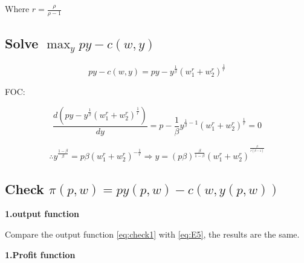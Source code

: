 \documentclass{article}
\begin{document}
Where $r = \frac{\rho}{\rho -1}$

\subsection{Solve $\max_y py - c(w, y)$ }

$$py - c(w, y) = py - y^{\frac{1}{\beta}}{(w_1^r + w_2^r)^{\frac{1}{r}}} $$

FOC:

$$\frac{d(py - y^{\frac{1}{\beta}}{(w_1^r + w_2^r)^{\frac{1}{r}}})}{dy}= p - \frac{1}{\beta}y^{\frac{1}{\beta} - 1} (w_1^r + w_2^r)^{\frac{1}{r}} = 0$$

\begin{equation}
\therefore y^{\frac{1- \beta}{\beta}} = p \beta (w_1^r + w_2^r)^{-\frac{1}{r}}  \Rightarrow y =  (p \beta)^{\frac{\beta}{1- \beta}} (w_1^r + w_2^r)^{^{\frac{\beta}{r(\beta - 1)}}}
    \label{eq:check1}   
\end{equation}

\subsection{Check $\pi (p,w) = py(p,w) - c(w, y(p,w))$}

\textbf{1.output function}

Compare the output function \ref{eq:check1} with \ref{eq:E5}, the results are the same.

\textbf{1.Profit function}
\end{document}
